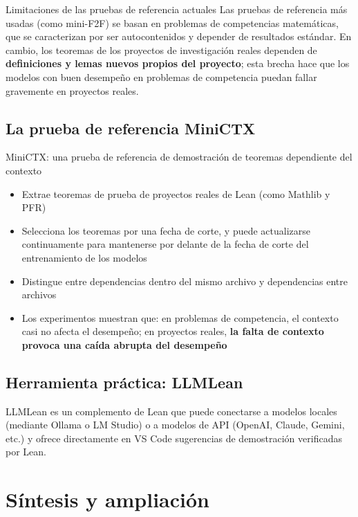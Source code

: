 \documentclass[a4paper]{article}
\begin{document}
\begin{warningbox}{Limitaciones de las pruebas de referencia actuales}
Las pruebas de referencia más usadas (como mini-F2F) se basan en problemas de competencias matemáticas, que se caracterizan por ser autocontenidos y depender de resultados estándar. En cambio, los teoremas de los proyectos de investigación reales dependen de \textbf{definiciones y lemas nuevos propios del proyecto}; esta brecha hace que los modelos con buen desempeño en problemas de competencia puedan fallar gravemente en proyectos reales.
\end{warningbox}

\subsection{La prueba de referencia MiniCTX}

\begin{importantbox}{MiniCTX: una prueba de referencia de demostración de teoremas dependiente del contexto}
\begin{itemize}
    \item Extrae teoremas de prueba de proyectos reales de Lean (como Mathlib y PFR)
    \item Selecciona los teoremas por una fecha de corte, y puede actualizarse continuamente para mantenerse por delante de la fecha de corte del entrenamiento de los modelos
    \item Distingue entre dependencias dentro del mismo archivo y dependencias entre archivos
    \item Los experimentos muestran que: en problemas de competencia, el contexto casi no afecta el desempeño; en proyectos reales, \textbf{la falta de contexto provoca una caída abrupta del desempeño}
\end{itemize}
\end{importantbox}

\subsection{Herramienta práctica: LLMLean}

LLMLean es un complemento de Lean que puede conectarse a modelos locales (mediante Ollama o LM Studio) o a modelos de API (OpenAI, Claude, Gemini, etc.) y ofrece directamente en VS Code sugerencias de demostración verificadas por Lean.
\section{Síntesis y ampliación}
\end{document}
